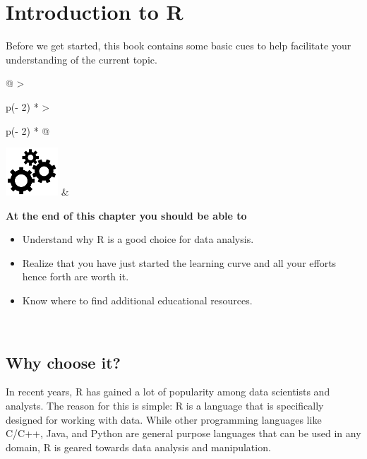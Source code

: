 \documentclass[
]{book}
\begin{document}
\hypertarget{introduction-to-r}{%
\chapter{Introduction to R}\label{introduction-to-r}}

Before we get started, this book contains some basic cues to help facilitate your understanding of the current topic.

\hfill\break

\begin{longtable}[]{@{}
  >{\raggedright\arraybackslash}p{(\columnwidth - 2\tabcolsep) * }
  >{\raggedright\arraybackslash}p{(\columnwidth - 2\tabcolsep) * }@{}}
\toprule\noalign{}
\endhead
\bottomrule\noalign{}
\endlastfoot
\includegraphics[width=\textwidth,height=0.70833in]{images/03.png} & \begin{minipage}[t]{\linewidth}\raggedright
\textbf{At the end of this chapter you should be able to}

\begin{itemize}
\item
  Understand why R is a good choice for data analysis.
\item
  Realize that you have just started the learning curve and all your efforts hence forth are worth it.
\item
  Know where to find additional educational resources.
\end{itemize}
\end{minipage} \\
\end{longtable}

\hfill\break

\hypertarget{why-choose-it}{%
\section*{Why choose it?}\label{why-choose-it}}

In recent years, R has gained a lot of popularity among data scientists and analysts. The reason for this is simple: R is a language that is specifically designed for working with data. While other programming languages like C/C++, Java, and Python are general purpose languages that can be used in any domain, R is geared towards data analysis and manipulation.
\end{document}
